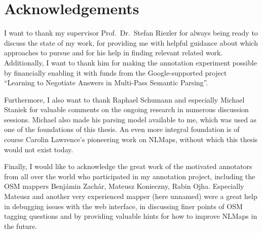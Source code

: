 \chapter{Acknowledgements}
\label{ch:acknowledgements}


I want to thank my supervisor Prof.~Dr.~Stefan Riezler for always being ready to
discuss the state of my work, for providing me with helpful guidance about which
approaches to pursue and for his help in finding relevant related work.
Additionally, I want to thank him for making the annotation experiment possible
by financially enabling it with funds from the Google-supported project
\enquote{Learning to Negotiate Answers in Multi-Pass Semantic Parsing}.

Furthermore, I also want to thank Raphael Schumann and especially Michael
Staniek for valuable comments on the ongoing research in numerous discussion
sessions. Michael also made his parsing model available to me, which was used as
one of the foundations of this thesis. An even more integral foundation is of
course Carolin Lawrence’s pioneering work on NLMaps, without which this thesis
would not exist today.

Finally, I would like to acknowledge the great work of the motivated annotators
from all over the world who participated in my annotation project, including the
OSM mappers Benjámin Zachár, Mateusz Konieczny, Rabin Ojha. Especially Mateusz
and another very experienced mapper (here unnamed) were a great help in
debugging issues with the web interface, in discussing finer points of OSM
tagging questions and by providing valuable hints for how to improve NLMaps in
the future.

